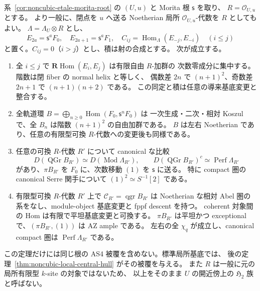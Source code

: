 \begin{theorem}
\label{thm:noncubic-local-tails-effectivity}
系~\ref{cor:noncubic-etale-morita-root} の $(U,u)$ と Morita 根 $\mathsf s$ を取り、
$R=\mathcal O_{U,u}$ とする。
より一般に、閉点を $u$ へ送る Noetherian 局所 $\mathcal O_{U,u}$-代数を $R$ としてもよい。
$\Lambda=\Lambda_U\otimes R$ とし、
\[
 E_{2a}=\mathsf s^aF_0,\quad E_{2a+1}=\mathsf s^aF_1,
 \quad C_{ij}=\operatorname{Hom}_{\Lambda}(E_{-j},E_{-i})\quad(i\le j)
\]
と置く。$C_{ij}=0$（$i>j$）とし、積は射の合成とする。
次が成立する。
\begin{enumerate}
\item 全 $i\le j$ で $\mathbf R\operatorname{Hom}(E_i,E_j)$ は有限自由 $R$-加群の
  次数零成分に集中する。階数は閉 fiber の normal helix と等しく、
  偶数差 $2n$ で $(n+1)^2$、奇数差 $2n+1$ で $(n+1)(n+2)$ である。
  この同定と積は任意の導来基底変更と整合する。
\item 全軌道環
  $B=\bigoplus_{n\ge0}\operatorname{Hom}(F_0,\mathsf s^nF_0)$ は
  一次生成・二次・相対 Koszul で、全 $B_n$ は階数 $(n+1)^2$ の自由加群である。
  $B$ は左右 Noetherian であり、任意の有限型可換 $R$-代数への変更後も同様である。
\item 任意の可換 $R$-代数 $R'$ について canonical な比較
  \[
  D(\operatorname{QGr}B_{R'})\simeq D(\operatorname{Mod}\Lambda_{R'}),
  \qquad D(\operatorname{QGr}B_{R'})^c\simeq\operatorname{Perf}\Lambda_{R'}
  \]
  があり、$\pi B_{R'}$ を $F_0$ に、次数移動 $(1)$ を $\mathsf s$ に送る。
  特に compact 圏の canonical Serre 関手について $(1)^2\simeq S^{-1}[2]$ である。
\item 有限型可換 $R$-代数 $R'$ 上で $\mathcal C_{R'}=\operatorname{qgr}B_{R'}$ は
  Noetherian な相対 Abel 圏の系をなし、module-object 基底変更と fppf descent を持つ。
  coherent 対象間の Hom は有限で平坦基底変更と可換する。
  $\pi B_{R'}$ は平坦かつ exceptional で、$(\pi B_{R'},(1))$ は AZ ample である。
  左右の全 $\chi_q$ が成立し、canonical compact 圏は $\operatorname{Perf}\Lambda_{R'}$ である。
\end{enumerate}
この定理だけには同じ根の AS4 被覆を含めない。標準局所基底では、
後の定理~\ref{thm:noncubic-local-central-hull} がその被覆を与える。
また $R$ は一般に元の局所有限型 $k$-site の対象ではないため、
以上をそのまま $U$ の開近傍上の $\mathfrak H_2$ 族と呼ばない。
\end{theorem}

